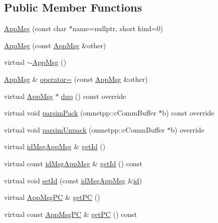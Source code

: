 \subsection*{Public Member Functions}
\begin{DoxyCompactItemize}
\item 
\hyperlink{classAppMsg_abcde1b0a82cb815e59b04ba891f8d1a0}{App\+Msg} (const char $\ast$name=nullptr, short kind=0)
\item 
\hyperlink{classAppMsg_a1b1df77f37c0aba71d69dd65b963c5d5}{App\+Msg} (const \hyperlink{classAppMsg}{App\+Msg} \&other)
\item 
virtual \hyperlink{classAppMsg_ac15790acabb2755dd83d1d29f57e498c}{$\sim$\+App\+Msg} ()
\item 
\hyperlink{classAppMsg}{App\+Msg} \& \hyperlink{classAppMsg_abb8f6f1fa21e6597ff28f6df72b435ad}{operator=} (const \hyperlink{classAppMsg}{App\+Msg} \&other)
\item 
virtual \hyperlink{classAppMsg}{App\+Msg} $\ast$ \hyperlink{classAppMsg_ab4d1256f22c1ee48aec128e558a03940}{dup} () const override
\item 
virtual void \hyperlink{classAppMsg_a97036583c6a13015d1be1ac6cf87505e}{parsim\+Pack} (omnetpp\+::c\+Comm\+Buffer $\ast$b) const override
\item 
virtual void \hyperlink{classAppMsg_a6852bb25218542149dcfb9f8ba672b7f}{parsim\+Unpack} (omnetpp\+::c\+Comm\+Buffer $\ast$b) override
\item 
virtual \hyperlink{AppMsg__m_8h_a0bd5e3a5ba85ac1fa0fd0fae34d903c1}{id\+Msg\+App\+Msg} \& \hyperlink{classAppMsg_abd9e4fa4ce0b074123b4e0cf64f5d743}{get\+Id} ()
\item 
virtual const \hyperlink{AppMsg__m_8h_a0bd5e3a5ba85ac1fa0fd0fae34d903c1}{id\+Msg\+App\+Msg} \& \hyperlink{classAppMsg_a0a87f5d332044dcd5ce861f6bcfaf6b2}{get\+Id} () const
\item 
virtual void \hyperlink{classAppMsg_ac76f921f7a873b5ca4b944fbbacfdf1c}{set\+Id} (const \hyperlink{AppMsg__m_8h_a0bd5e3a5ba85ac1fa0fd0fae34d903c1}{id\+Msg\+App\+Msg} \&\hyperlink{classAppMsg_aadaa93732c4df84c8b2ef13d7199f9a1}{id})
\item 
virtual \hyperlink{AppMsg__m_8h_abcd76636e4b750d033ffc348601dd7a2}{App\+Msg\+PC} \& \hyperlink{classAppMsg_a50acdb9331a812120c945612e81cd04f}{get\+PC} ()
\item 
virtual const \hyperlink{AppMsg__m_8h_abcd76636e4b750d033ffc348601dd7a2}{App\+Msg\+PC} \& \hyperlink{classAppMsg_a19864419107e294ac7c64553ceb5a9f0}{get\+PC} () const
\item 

\end{DoxyCompactItemize}
